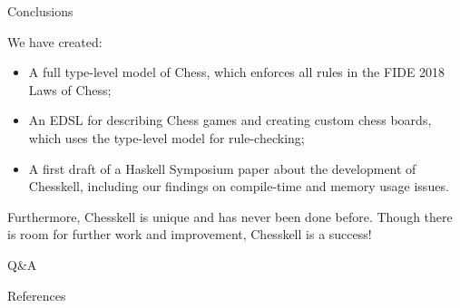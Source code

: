 \documentclass{beamer}
\begin{document}
\begin{frame}{Conclusions}

We have created:

\pause

\begin{itemize}
    \item<2-> A full type-level model of Chess, which enforces all rules in the FIDE 2018 Laws of Chess;
    \item<3-> An EDSL for describing Chess games and creating custom chess boards, which uses the type-level model for rule-checking;
    \item<4-> A first draft of a Haskell Symposium paper about the development of Chesskell, including our findings on compile-time and memory usage issues.
\end{itemize}

\begin{overprint}
Furthermore, Chesskell is unique and has never been done before. Though there is room for further work and improvement, Chesskell is a success!
\end{overprint}

    
\end{frame}

\begin{frame}[standout]

Q\&A
    
\end{frame}

\begin{frame}[allowframebreaks]{References}

\printbibliography
    
\end{frame}
\end{document}
